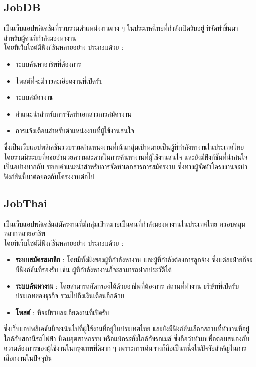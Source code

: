 \subsection{JobDB}
เป็นเว็บแอปพลิเคชันที่รวบรวมตำแหน่งงานต่าง ๆ ในประเทศไทยที่กำลังเปิดรับอยู่ ที่จัดทำขึ้นมาสำหรับผู้คนที่กำลังมองหางาน \\
โดยที่เว็บไซต์มีฟังก์ชันหลายอย่าง ประกอบด้วย :
\begin{itemize}
      \item ระบบค้นหาอาชีพที่ต้องการ
      \item โพสต์ที่จะมีรายละเอียดงานที่เปิดรับ
      \item ระบบสมัครงาน
      \item คำแนะนำสำหรับการจัดทำเอกสารการสมัครงาน
      \item การแจ้งเตือนสำหรับตำแหน่งงานที่ผู้ใช้งานสนใจ
\end{itemize}
\par ซึ่งเป็นเว็บแอปพลิเคชันรวบรวมตำแหน่งงานที่เน้นกลุ่มเป้าหมายเป็นผู้ที่กำลังหางานในประเทศไทย โดยรวมมีระบบที่คอยอำนวยความสะดวกในการค้นหางานที่ผู้ใช้งานสนใจ
และยังมีฟังก์ชันที่น่าสนใจเป็นอย่างมากกับ ระบบคำแนะนำสำหรับการจัดทำเอกสารการสมัครงาน ซึ่งทางผู้จัดทำโครงงานจะนำฟังก์ชันนี้มาต่อยอดกับโครงงานต่อไป

\subsection{JobThai}
เป็นเว็บแอปพลิเคชันสมัครงานที่มีกลุ่มเป้าหมายเป็นคนที่กำลังมองหางานในประเทศไทย ครอบคลุมหลากหลายอาชีพ \\
โดยที่เว็บไซต์มีฟังก์ชันหลายอย่าง ประกอบด้วย :
\begin{itemize}
      \item \textbf{ระบบสมัครสมาชิก} : โดยมีทั้งฝั่งของผู้ที่กำลังหางาน และผู้ที่กำลังต้องการลูกจ้าง ซึ่งแต่ละฝ่ายก็จะมีฟังก์ชันที่รองรับ เช่น ผู้ที่กำลังหางานก็จะสามารถฝากประวัติได้
      \item \textbf{ระบบค้นหางาน} : โดยสามารถคัดกรองได้ด้วยอาชีพที่ต้องการ สถานที่ทำงาน บริษัทที่เปิดรับ ประเภทของธุรกิจ รวมไปถึงเงินเดือนอีกด้วย
      \item \textbf{โพสต์} : ที่จะมีรายละเอียดงานที่เปิดรับ
\end{itemize}
\par ซึ่งเว็บแอปพลิเคชันนี้จะเน้นไปที่ผู้ใช้งานที่อยู่ในประเทศไทย และยังมีฟังก์ชันเลือกสถานที่ทำงานที่อยู่ใกล้กับสถานีรถไฟฟ้า นิคมอุตสาหกรรม หรือแม้กระทั่งใกล้กับรถเมล์
ซึ่งถือว่าทำมาเพื่อตอบสนองกับความต้องการของผู้ใช้งานในกรุงเทพที่ดีมาก ๆ เพราะการเดินทางก็ถือเป็นหนึ่งในปัจจัยสำคัญในการเลือกงานในปัจจุบัน

